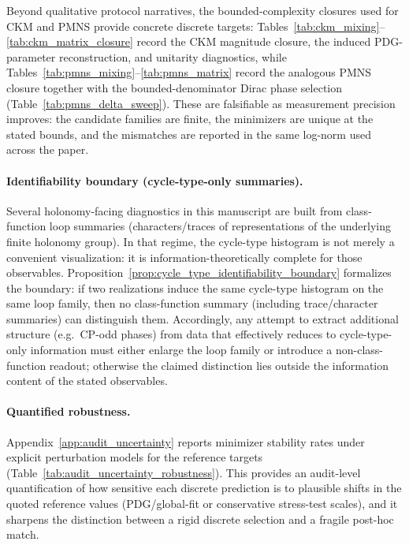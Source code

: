Beyond qualitative protocol narratives, the bounded-complexity closures used for CKM and PMNS provide concrete discrete targets:
Tables~\ref{tab:ckm_mixing}--\ref{tab:ckm_matrix_closure} record the CKM magnitude closure, the induced PDG-parameter reconstruction, and unitarity diagnostics, while Tables~\ref{tab:pmns_mixing}--\ref{tab:pmns_matrix} record the analogous PMNS closure together with the bounded-denominator Dirac phase selection (Table~\ref{tab:pmns_delta_sweep}).
These are falsifiable as measurement precision improves: the candidate families are finite, the minimizers are unique at the stated bounds, and the mismatches are reported in the same log-norm used across the paper.

\paragraph{Identifiability boundary (cycle-type-only summaries).}
\AuditTag Several holonomy-facing diagnostics in this manuscript are built from class-function loop summaries (characters/traces of representations of the underlying finite holonomy group).
In that regime, the cycle-type histogram is not merely a convenient visualization: it is information-theoretically complete for those observables.
Proposition~\ref{prop:cycle_type_identifiability_boundary} formalizes the boundary: if two realizations induce the same cycle-type histogram on the same loop family, then no class-function summary (including trace/character summaries) can distinguish them.
Accordingly, any attempt to extract additional structure (e.g.\ CP-odd phases) from data that effectively reduces to cycle-type-only information must either enlarge the loop family or introduce a non-class-function readout; otherwise the claimed distinction lies outside the information content of the stated observables.

\paragraph{Quantified robustness.}
Appendix~\ref{app:audit_uncertainty} reports minimizer stability rates under explicit perturbation models for the reference targets (Table~\ref{tab:audit_uncertainty_robustness}).
This provides an audit-level quantification of how sensitive each discrete prediction is to plausible shifts in the quoted reference values (PDG/global-fit or conservative stress-test scales), and it sharpens the distinction between a rigid discrete selection and a fragile post-hoc match.

